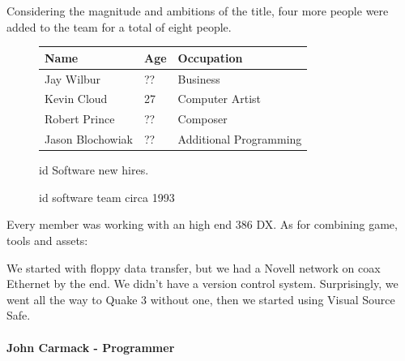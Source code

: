 \documentclass[book.tex]{subfiles}
\begin{document}
Considering the magnitude and ambitions of the title, four more people were added to the team for a total of eight people.\\

 \begin{figure}[H]
\centering  
\begin{tabularx}{\textwidth}{ X  X  X  }
  \toprule
  \textbf{Name} &  \textbf{Age} & \textbf{Occupation} \\
  \toprule 
   Jay Wilbur & ?? &  Business\\
   Kevin Cloud & 27 &  Computer Artist\\
   Robert Prince & ?? &  Composer\\
   Jason Blochowiak & ?? &  Additional Programming\\
     \toprule
\end{tabularx}
\caption{id Software new hires.}\label{fig:Id Software hires}
\end{figure}

\begin{figure}[H]
\centering
\caption{id software team circa 1993}
\label{fig:id_team_1993}
\end{figure}


Every member was working with an high end 386 DX. As for combining game, tools and assets:\\

 \begin{fancyquotes}
We started with floppy data transfer, but we had a Novell network on coax Ethernet by the end. We didn't have a version control system.  Surprisingly, we went all the way to Quake 3 without one, then we started using Visual Source Safe.\\
 \\
\textbf{John Carmack - Programmer}
\end{fancyquotes}
\end{document}
